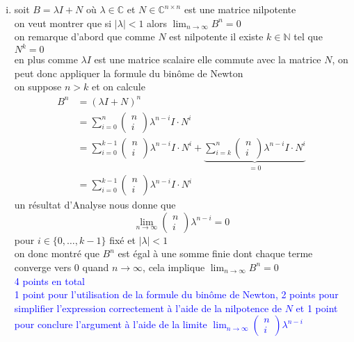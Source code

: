 \documentclass[11pt, a4paper, oneside]{article}
\begin{document}
\begin{enumerate}[i)]
\item 
soit $B=\lambda I+N$ où $\lambda \in \mathbb{C}$ et $N \in \mathbb{C}^{n \times n}$ est une matrice nilpotente \\
on veut montrer que si $|\lambda|<1$ alors $\lim_{n\rightarrow \infty}B^n = 0$ \\
{\tiny on remarque d'abord que comme $N$ est nilpotente il existe $k \in \mathbb{N}$ tel que $N^k = 0$} \\
{\tiny en plus comme $\lambda I$ est une matrice scalaire elle commute avec la matrice $N$,} on peut donc appliquer la formule du binôme de Newton \\
on suppose $n>k$ et on calcule
\begin{align*}
    B^n &= (\lambda I + N)^n \\
    &= \sum_{i=0}^n \begin{pmatrix} n \\ i \end{pmatrix} \lambda^{n-i}I \cdot N^i \\
    &= \sum_{i=0}^{k-1} \begin{pmatrix} n \\ i \end{pmatrix} \lambda^{n-i}I \cdot N^i + \underbrace{\sum_{i=k}^n \begin{pmatrix} n \\ i \end{pmatrix} \lambda^{n-i}I \cdot N^i}_{=0} \\
    &= \sum_{i=0}^{k-1} \begin{pmatrix} n \\ i \end{pmatrix} \lambda^{n-i}I \cdot N^i
\end{align*}
{\tiny un résultat d'Analyse nous donne que} $$\lim_{n \rightarrow \infty} \begin{pmatrix} n \\ i \end{pmatrix} \lambda^{n-i} = 0$$ pour $i \in \{0,\ldots,k-1\}$ fixé et $|\lambda|<1$ \\
{\tiny on donc montré que $B^n$ est égal à une somme finie dont} chaque terme converge vers 0 quand $n \rightarrow \infty$, cela implique $\lim_{n\rightarrow \infty}B^n = 0$ \\
\textcolor{blue}{4 points en total \\ 1 point pour l'utilisation de la formule du binôme de Newton, 2 points pour simplifier l'expression correctement à l'aide de la nilpotence de $N$ et 1 point pour conclure l'argument à l'aide de la limite $\lim_{n \rightarrow \infty} \begin{pmatrix} n \\ i \end{pmatrix} \lambda^{n-i}$} 


\end{enumerate}
\end{document}
